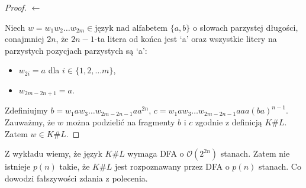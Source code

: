 \documentclass{article}
\theoremstyle{definition}
\theoremstyle{remark}
\begin{document}
\begin{proof}

    \(\leftarrow\)

    Niech \(w = w_1 w_2 \ldots w_{2m}\in \text{język nad alfabetem } \{ a, b \}\) o
    słowach parzystej długości, conajmniej \(2n\), że \(2n-1\)-ta litera od końca
    jest `a' oraz wszystkie litery na parzystych pozycjach parzystych są `a':

    \begin{itemize} 
        \item \(w_{2i} = a\) dla \(i \in \{1, 2, \ldots m\}\),
        \item \(w_{2m-2n+1} = a\).
    \end{itemize}

    Zdefiniujmy \(b = w_1 a w_3 \ldots w_{2m-2n-1} a a^{2n}\), \(c = w_1 a w_3
    \ldots w_{2m-2n-1} a a a (ba)^{n-1}\). Zauważmy, że \(w\) można podzielić na
    fragmenty \(b\) i \(c\) zgodnie z definicją \(K \# L\). Zatem \(w \in K \# L\).

\end{proof}

Z wykładu wiemy, że język \(K \# L\) wymaga DFA o \( \mathcal{O}(2^{2n}) \) stanach.
Zatem nie istnieje \(p(n)\) takie, że \(K \# L\) jest rozpoznawany przez DFA o \(p(n)\) stanach.
Co dowodzi fałszywości zdania z polecenia.
\end{document}
